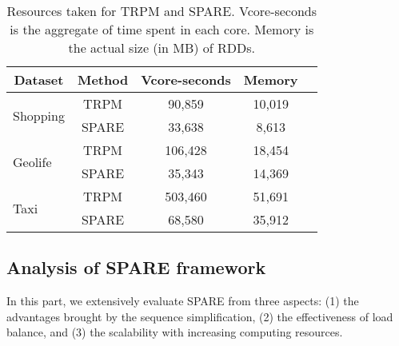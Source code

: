 \begin{table}[h]
\centering
\begin{tabular}{|l|c|c|c|c|}
\hline
\multicolumn{1}{|c|}{\textbf{Dataset}} & \textbf{Method} 
& \textbf{Vcore-seconds} & \textbf{Memory} \\ \hline
\multirow{2}{*}{Shopping}              & TRPM           
                               & 90,859                 & 10,019               \\ 
                                       & SPARE           
                                                                      & 33,638                 & 8,613                \\ \hline
\multirow{2}{*}{Geolife}               & TRPM            
                              & 106,428                & 18,454               \\
                                       & SPARE            
                                                                     & 35,343                 & 14,369               \\ \hline
\multirow{2}{*}{Taxi}                  & TRPM            
                           & 503,460                & 51,691               \\ 
                                       & SPARE           
                                                                    & 68,580                & 35,912               \\ \hline
\end{tabular}
\caption{Resources taken for TRPM and SPARE. Vcore-seconds is the aggregate of time spent in each core. Memory is the actual size (in MB) of RDDs.}
\label{tbl:resource}
\end{table}

\subsection{Analysis of SPARE framework}
In this part, we extensively evaluate SPARE from three aspects:
(1) the advantages brought by the sequence simplification, (2) the effectiveness of load balance, and (3) the scalability with increasing computing resources.


